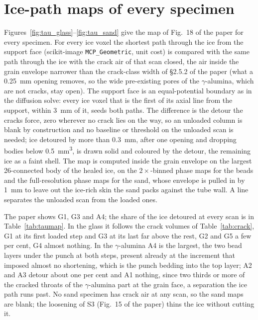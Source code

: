 \documentclass[preprint,12pt]{elsarticle}
\begin{document}
\section{Ice-path maps of every specimen}
Figures~\ref{fig:tau_glass}--\ref{fig:tau_sand} give the map of Fig.~18 of
the paper for every specimen.  For every ice voxel the shortest path
through the ice from the support face (scikit-image
\texttt{MCP\_Geometric}, unit cost) is compared with the same path through
the ice with the crack air of that scan closed, the air inside the grain
envelope narrower than the crack-class width of \S2.5.2 of the paper
(what a \SI{0.25}{\milli\meter} opening removes, so the wide pre-existing
pores of the $\gamma$-alumina, which are not cracks, stay open).  The
support face is an equal-potential boundary as in the diffusion solve:
every ice voxel that is the first of its axial line from the support,
within \SI{3}{\milli\meter} of it, seeds both paths.  The difference is the
detour the cracks force, zero wherever no crack lies on the way, so an
unloaded column is blank by construction and no baseline or threshold on
the unloaded scan is needed; ice detoured by more than
\SI{0.3}{\milli\meter}, after one opening and dropping bodies below
\SI{0.5}{\milli\meter\cubed}, is drawn solid and coloured by the detour,
the remaining ice as a faint shell.  The map is computed inside the grain
envelope on the largest 26-connected body of the healed ice, on the
$2\times$-binned phase maps for the beads and the full-resolution phase
maps for the sand, whose envelope is pulled in by \SI{1}{\milli\meter} to
leave out the ice-rich skin the sand packs against the tube wall.  A line
separates the unloaded scan from the loaded ones.

The paper shows G1, G3 and A4; the share of the ice detoured at every scan
is in Table~\ref{tab:taumap}.  In the glass it follows the crack volumes of
Table~\ref{tab:crack}, G1 at its first loaded step and G3 at its last far
above the rest, G2 and G5 a few per cent, G4 almost nothing.  In the
$\gamma$-alumina A4 is the largest, the two bead layers under the punch at
both steps, present already at the increment that imposed almost no
shortening, which is the punch bedding into the top layer; A2 and A3 detour
about one per cent and A1 nothing, since two thirds or more of the cracked
throats of the $\gamma$-alumina part at the grain face, a separation the
ice path runs past.  No sand specimen has crack air at any scan, so the
sand maps are blank; the loosening of S3 (Fig.~15 of the paper) thins the
ice without cutting it.
\end{document}
